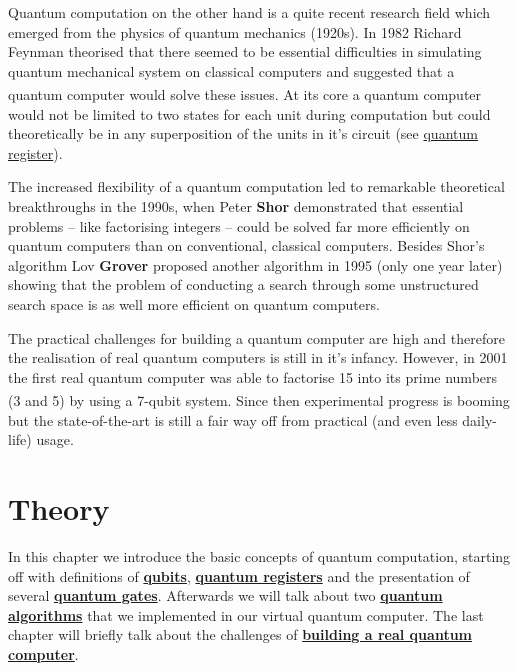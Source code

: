 \documentclass[bibliography=totocnumbered, 10pt]{article}
\newcommand{\citeS}[1]{\textsuperscript{\cite{#1}}}
\theoremstyle{NoticeStyle}
\begin{document}
Quantum computation on the other hand is a quite recent research field which emerged from the physics of quantum mechanics (1920s). In 1982 Richard Feynman theorised that there seemed to be essential difficulties in simulating quantum mechanical system on classical computers and suggested that a quantum computer would solve these issues.\citeS{Nielsen2010} At its core a quantum computer would not be limited to two states for each unit during computation but could theoretically be in any superposition of the units in it's circuit (see \hyperref[sec:Quantum Register]{quantum register}).

The increased flexibility of a quantum computation led to remarkable theoretical breakthroughs in the 1990s, when Peter \textbf{Shor} demonstrated that essential problems -- like factorising integers -- could be solved far more efficiently on quantum computers than on conventional, classical computers. Besides Shor's algorithm Lov \textbf{Grover} proposed another algorithm in 1995 (only one year later) showing that the problem of conducting a search through some unstructured search space is as well more efficient on quantum computers.

The practical challenges for building a quantum computer are high and therefore the realisation of real quantum computers is still in it's infancy. However, in 2001 the first real quantum computer was able to factorise 15 into its prime numbers (3 and 5) by using a 7-qubit system.\citeS{ShorsAlgoReal} Since then experimental progress is booming but the state-of-the-art is still a fair way off from practical (and even less daily-life) usage.


%
\section{Theory}\label{sec:Theory}

In this chapter we introduce the basic concepts of quantum computation, starting off with definitions of \hyperref[sec:Qubits]{\textbf{qubits}}, \hyperref[sec:Quantum register]{\textbf{quantum registers}} and the presentation of several \hyperref[sec:Quantum gates]{\textbf{quantum gates}}. Afterwards we will talk about two \hyperref[sec:Quantum algorithms]{\textbf{quantum algorithms}} that we implemented in our virtual quantum computer. The last chapter will briefly talk about the challenges of \hyperref[sec:Building a quantum computer]{\textbf{building a real quantum computer}}.
\end{document}
